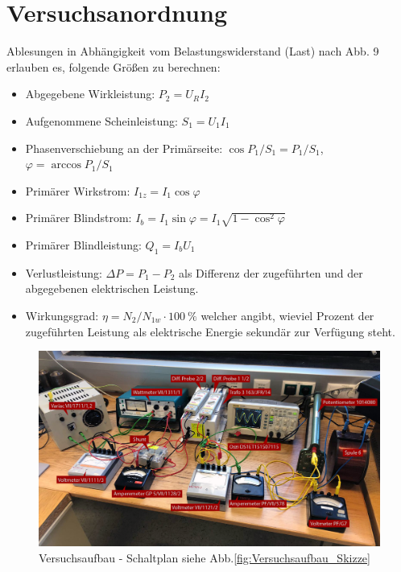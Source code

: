 \documentclass[12pt,a4paper,twoside]{article}
\theoremstyle{definition}
\begin{document}
\section{Versuchsanordnung}

Ablesungen in Abhängigkeit vom Belastungswiderstand (Last) nach Abb. 9 erlauben es, folgende Größen zu berechnen:
\begin{itemize}
    \item Abgegebene Wirkleistung: $P_2 = U_R I_2$
    \item Aufgenommene Scheinleistung: $S_1 = U_1 I_1$
    \item Phasenverschiebung an der Primärseite: $\cos P_1 / S_1 = P_1 / S_1$, $\varphi = \arccos P_1 / S_1$
    \item Primärer Wirkstrom: $I_{1z} = I_1 \cos \varphi$
    \item Primärer Blindstrom: $I_b = I_1 \sin \varphi = I_1 \sqrt{1 - \cos^2 \varphi}$
    \item Primärer Blindleistung: $Q_1 = I_b U_1$
    \item Verlustleistung: $\Delta P = P_1 - P_2$ als Differenz der zugeführten und der abgegebenen elektrischen Leistung.
    \item Wirkungsgrad: $\eta = N_2 / N_{1w} \cdot \SI{100}{\percent}$ welcher angibt, wieviel Prozent der zugeführten Leistung als elektrische Energie sekundär zur Verfügung steht.
\end{itemize}
\begin{figure}[H]
    \centering
    \includegraphics[width=\linewidth]{Trafo-Aufbau.png}
    \caption{Versuchsaufbau - Schaltplan siehe Abb.\ref{fig:Versuchsaufbau_Skizze}}
    \label{fig:Versuchsaufbau}
\end{figure}
\end{document}
